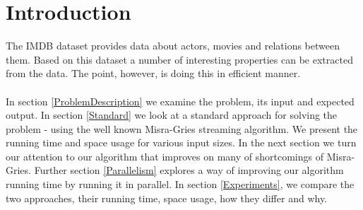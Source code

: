 \section{Introduction}
\label{Introduction}

The IMDB dataset provides data about actors, movies and relations between them. Based on this dataset a number of interesting properties can be extracted from the data. The point, however, is doing this in efficient manner.
\\
\\
In section \ref{ProblemDescription} we examine the problem, its input and expected output. In section \ref{Standard} we look at a standard approach for solving the problem - using the well known Misra-Gries streaming algorithm. We present the running time and space usage for various input sizes. In the next section we turn our attention to our algorithm that improves on many of shortcomings of Misra-Gries. Further section \ref{Parallelism} explores a way of improving our algorithm running time by running it in parallel. In section \ref{Experiments}, we compare the two approaches, their running time, space usage, how they differ and why.
